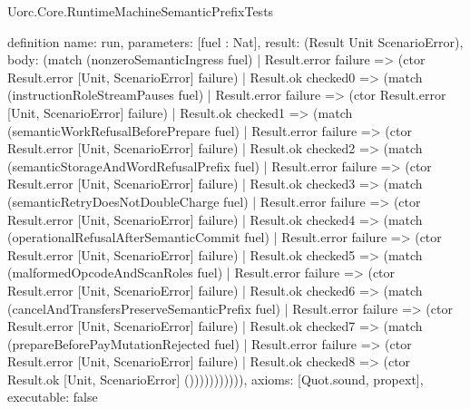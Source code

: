 \begin{lexlean}{Uorc.Core.RuntimeMachineSemanticPrefixTests}
\begin{semanticmodule}
definition{
  name: run,
  parameters: [fuel : Nat],
  result: (Result Unit ScenarioError),
  body: (match (nonzeroSemanticIngress fuel)
    | Result.error failure => (ctor Result.error [Unit, ScenarioError] failure)
    | Result.ok checked0 => (match (instructionRoleStreamPauses fuel)
      | Result.error failure => (ctor Result.error [Unit, ScenarioError] failure)
      | Result.ok checked1 => (match (semanticWorkRefusalBeforePrepare fuel)
        | Result.error failure => (ctor Result.error [Unit, ScenarioError] failure)
        | Result.ok checked2 => (match (semanticStorageAndWordRefusalPrefix fuel)
          | Result.error failure => (ctor Result.error [Unit, ScenarioError] failure)
          | Result.ok checked3 => (match (semanticRetryDoesNotDoubleCharge fuel)
            | Result.error failure => (ctor Result.error [Unit, ScenarioError] failure)
            | Result.ok checked4 => (match (operationalRefusalAfterSemanticCommit fuel)
              | Result.error failure => (ctor Result.error [Unit, ScenarioError] failure)
              | Result.ok checked5 => (match (malformedOpcodeAndScanRoles fuel)
                | Result.error failure => (ctor Result.error [Unit, ScenarioError] failure)
                | Result.ok checked6 => (match (cancelAndTransfersPreserveSemanticPrefix fuel)
                  | Result.error failure => (ctor Result.error [Unit, ScenarioError] failure)
                  | Result.ok checked7 => (match (prepareBeforePayMutationRejected fuel)
                    | Result.error failure => (ctor Result.error [Unit, ScenarioError] failure)
                    | Result.ok checked8 => (ctor Result.ok [Unit, ScenarioError] ())))))))))),
  axioms: [Quot.sound, propext],
  executable: false
}
\end{semanticmodule}
\end{lexlean}
